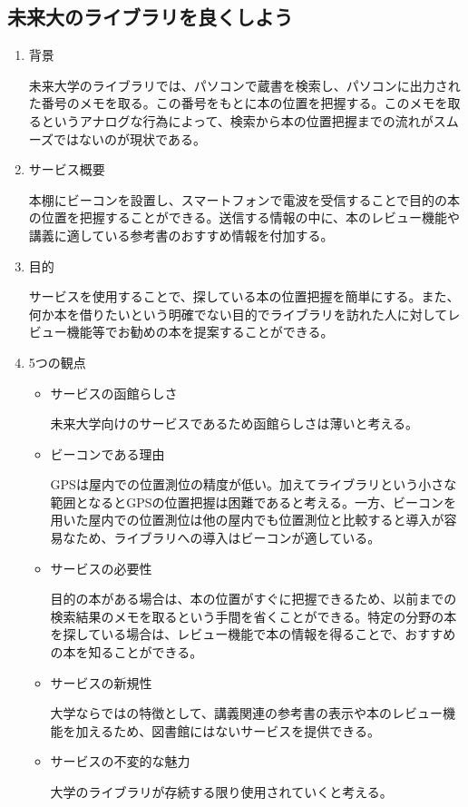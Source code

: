 \subsection{未来大のライブラリを良くしよう}
\begin{enumerate}
    \item 背景
    \par 未来大学のライブラリでは、パソコンで蔵書を検索し、パソコンに出力された番号のメモを取る。この番号をもとに本の位置を把握する。このメモを取るというアナログな行為によって、検索から本の位置把握までの流れがスムーズではないのが現状である。
    \item サービス概要
    \par 本棚にビーコンを設置し、スマートフォンで電波を受信することで目的の本の位置を把握することができる。送信する情報の中に、本のレビュー機能や講義に適している参考書のおすすめ情報を付加する。
    \item 目的
    \par サービスを使用することで、探している本の位置把握を簡単にする。また、何か本を借りたいという明確でない目的でライブラリを訪れた人に対してレビュー機能等でお勧めの本を提案することができる。
    \item 5つの観点
    \begin{itemize}
        \item サービスの函館らしさ
        \par 未来大学向けのサービスであるため函館らしさは薄いと考える。
        \item ビーコンである理由
        \par GPSは屋内での位置測位の精度が低い。加えてライブラリという小さな範囲となるとGPSの位置把握は困難であると考える。一方、ビーコンを用いた屋内での位置測位は他の屋内でも位置測位と比較すると導入が容易なため、ライブラリへの導入はビーコンが適している。
        \item サービスの必要性
        \par 目的の本がある場合は、本の位置がすぐに把握できるため、以前までの検索結果のメモを取るという手間を省くことができる。特定の分野の本を探している場合は、レビュー機能で本の情報を得ることで、おすすめの本を知ることができる。
        \item サービスの新規性
        \par 大学ならではの特徴として、講義関連の参考書の表示や本のレビュー機能を加えるため、図書館にはないサービスを提供できる。
        \item サービスの不変的な魅力
        \par 大学のライブラリが存続する限り使用されていくと考える。
    \end{itemize}
\end{enumerate}

